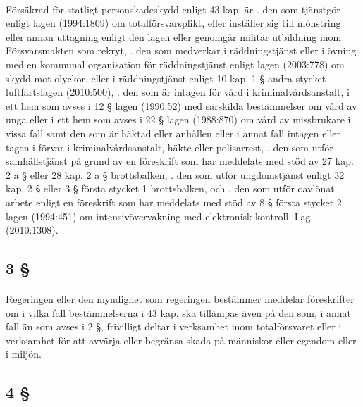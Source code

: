 \documentclass[a4paper,notitlepage,openany,10pt]{book}
\begin{document}
\paragraph*{}
Försäkrad för statligt personskadeskydd enligt 43 kap. är
. den som tjänstgör enligt lagen (1994:1809) om totalförsvarsplikt, eller inställer sig till mönstring eller annan uttagning enligt den lagen eller genomgår militär utbildning inom Försvarsmakten som rekryt,
. den som medverkar i räddningstjänst eller i övning med en kommunal organisation för räddningstjänst enligt lagen (2003:778) om skydd mot olyckor, eller i räddningstjänst enligt 10 kap. 1 § andra stycket luftfartslagen (2010:500),
. den som är intagen för vård i kriminalvårdsanstalt, i ett hem som avses i 12 § lagen (1990:52) med särskilda bestämmelser om vård av unga eller i ett hem som avses i 22 § lagen (1988:870) om vård av missbrukare i vissa fall samt den som är häktad eller anhållen eller i annat fall intagen eller tagen i förvar i kriminalvårdsanstalt, häkte eller polisarrest,
. den som utför samhällstjänst på grund av en föreskrift som har meddelats med stöd av 27 kap. 2 a § eller 28 kap. 2 a § brottsbalken,
. den som utför ungdomstjänst enligt 32 kap. 2 § eller 3 § första stycket 1 brottsbalken, och
. den som utför oavlönat arbete enligt en föreskrift som har meddelats med stöd av 8 § första stycket 2 lagen (1994:451) om intensivövervakning med elektronisk kontroll.
Lag (2010:1308).
\subsection*{3 §}
\paragraph*{}
Regeringen eller den myndighet som regeringen bestämmer meddelar föreskrifter om i vilka fall bestämmelserna i 43 kap. ska tillämpas även på den som, i annat fall än som avses i 2 §, frivilligt deltar i verksamhet inom totalförsvaret eller i verksamhet för att avvärja eller begränsa skada på människor eller egendom eller i miljön.
\subsection*{4 §}
\end{document}
